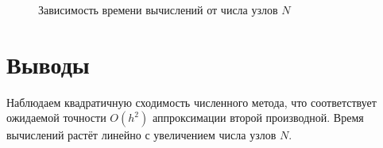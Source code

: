 \documentclass[a4paper,12pt]{article}
\begin{document}
\begin{figure}[H]
\centering
{}
\caption{Зависимость времени вычислений от числа узлов $N$}
\end{figure}

\section*{Выводы}
Наблюдаем квадратичную сходимость численного метода, что соответствует ожидаемой точности \( O(h^2) \) аппроксимации второй производной. Время вычислений растёт линейно с увеличением числа узлов $N$.
\end{document}
